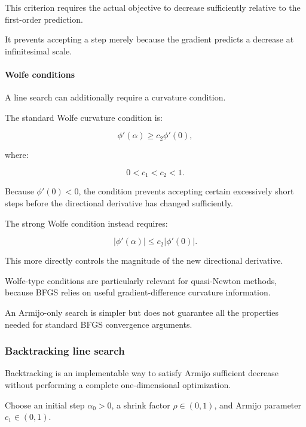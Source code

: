 This criterion requires the actual objective to decrease sufficiently relative to the first-order prediction.

It prevents accepting a step merely because the gradient predicts a decrease at infinitesimal scale.

\paragraph{Wolfe conditions}\label{02-foundations-ii-ch026-wolfe-conditions}

\hypertarget{02-foundations-ii-ch026-wolfe-conditions}{}

A line search can additionally require a curvature condition.

The standard Wolfe curvature condition is:

\[
\phi'(\alpha)\ge c_2\phi'(0),
\]

where:

\[
0<c_1<c_2<1.
\]

Because \(\phi'(0)<0\), the condition prevents accepting certain excessively short steps before the directional derivative has changed sufficiently.

The strong Wolfe condition instead requires:

\[
\boxed{ |\phi'(\alpha)|\le c_2|\phi'(0)| }.
\]

This more directly controls the magnitude of the new directional derivative.

Wolfe-type conditions are particularly relevant for quasi-Newton methods, because BFGS relies on useful gradient-difference curvature information.

An Armijo-only search is simpler but does not guarantee all the properties needed for standard BFGS convergence arguments.

\subsubsection{Backtracking line search}\label{02-foundations-ii-ch026-backtracking-line-search}

\hypertarget{02-foundations-ii-ch026-backtracking-line-search}{}

Backtracking is an implementable way to satisfy Armijo sufficient decrease without performing a complete one-dimensional optimization.

Choose an initial step \(\alpha_0>0\), a shrink factor \(\rho\in(0,1)\), and Armijo parameter \(c_1\in(0,1)\).


